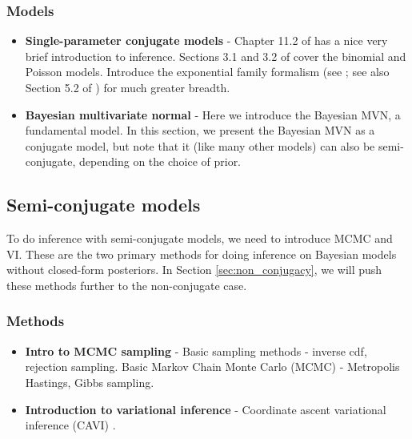 \documentclass{article} %
\begin{document}
\subsubsection{Models}
\begin{itemize}
	\item \textbf{Single-parameter conjugate models} - Chapter 11.2 of \cite{davison2003statistical} has a nice very brief introduction to inference.      Sections 3.1 and 3.2 of \cite{hoff2009first} cover the  binomial and Poisson models.   Introduce the exponential family formalism (see \cite{wojnowiczXXXXexponential};  see also Section 5.2 of \cite{davison2003statistical} ) for much greater breadth.  
	\item \textbf{Bayesian multivariate normal} -  Here we introduce the Bayesian MVN, a fundamental model. In this section, we present the Bayesian MVN as a conjugate model, but note that it (like many other models) can also be semi-conjugate,  depending on the choice of prior.
	\end{itemize}   




\subsection{Semi-conjugate models} \label{sec:semi_conjugacy}

To do inference with semi-conjugate models, we need to introduce MCMC and VI.  These are the two primary methods for doing inference on Bayesian models without closed-form posteriors. In Section \ref{sec:non_conjugacy}, we will push these methods further to the non-conjugate case.

\subsubsection{Methods}

\begin{itemize}
\item \textbf{Intro to MCMC sampling} - Basic sampling methods - inverse cdf,  rejection sampling. Basic Markov Chain Monte Carlo (MCMC) - Metropolis Hastings, Gibbs sampling.
\item \textbf{Introduction to variational inference} - Coordinate ascent variational inference (CAVI) \cite{wojnowiczXXXXfoundations}.
\end{itemize} 
\end{document}
